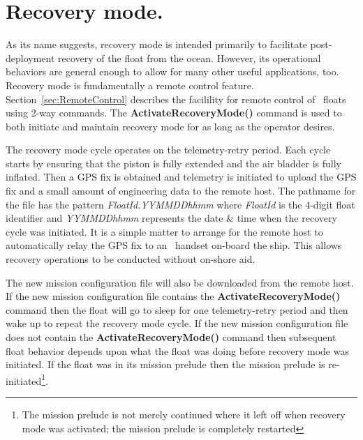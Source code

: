 %
%
%
%

\section{Recovery mode.}
\label{sec:RecoveryMode}

As its name suggests, recovery mode is intended primarily to facilitate
post-deployment recovery of the float from the ocean.  However, its
operational behaviors are general enough to allow for many other useful
applications, too. Recovery mode is fundamentally a remote control feature.
Section~\ref{sec:RemoteControl} describes the facilility for remote control
of \iridium\ floats using 2-way commands.  The
\textbf{ActivateRecoveryMode()} command is used to both initiate and
maintain recovery mode for as long as the operator desires.

The recovery mode cycle operates on the telemetry-retry period.  Each cycle
starts by ensuring that the piston is fully extended and the air bladder is
fully inflated.  Then a GPS fix is obtained and telemetry is initiated to
upload the GPS fix and a small amount of engineering data to the remote
host.  The pathname for the file has the pattern \emph{FloatId.YYMMDDhhmm}
where \emph{FloatId} is the 4-digit float identifier and \emph{YYMMDDhhmm}
represents the date \& time when the recovery cycle was initiated.  It is a
simple matter to arrange for the remote host to automatically relay the GPS
fix to an \iridium\ handset on-board the ship.  This allows recovery
operations to be conducted without on-shore aid.

The new mission configuration file will also be downloaded from the remote
host.  If the new mission configuration file contains the
\textbf{ActivateRecoveryMode()} command then the float will go to sleep for
one telemetry-retry period and then wake up to repeat the recovery mode
cycle.  If the new mission configuration file does not contain the
\textbf{ActivateRecoveryMode()} command then subsequent float behavior
depends upon what the float was doing before recovery mode was initiated.
If the float was in its mission prelude then the mission prelude is
re-initiated\footnote{The mission prelude is not merely continued where it
  left off when recovery mode was activated; the mission prelude is
  completely restarted}.

